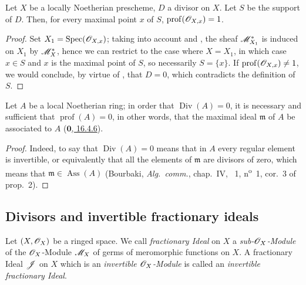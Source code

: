 \begin{corollary}[21.1.9]
\label{IV.21.1.9}
Let $X$ be a locally Noetherian prescheme, $D$ a divisor on $X$.
Let $S$ be the support of $D$.
Then, for every maximal point $x$ of $S$, $\operatorname{prof}(\mathscr{O}_{X,x})=1$.
\end{corollary}

\begin{proof}
Set $X_1=\operatorname{Spec}(\mathscr{O}_{X,x})$;
taking into account  and , the sheaf $\mathscr{M}_{X_1}^*$ is induced on $X_1$ by $\mathscr{M}_X^*$, hence we can restrict to the case where $X=X_1$, in which case $x\in S$ and $x$ is the maximal point of $S$, so necessarily $S=\{x\}$.
If $\operatorname{prof}(\mathscr{O}_{X,x})\neq 1$, we would conclude, by virtue of , that $D=0$, which contradicts the definition of $S$.
\end{proof}

\begin{proposition}[21.1.10]
\label{IV.21.1.10}
Let $A$ be a local Noetherian ring;
in order that $\operatorname{Div}(A)=0$, it is necessary and sufficient that $\operatorname{prof}(A)=0$, in other words, that the maximal ideal $\mathfrak{m}$ of $A$ be associated to $A$
\textup{(\hyperref[0.16.4.6]{$\mathbf{0}$, 16.4.6})}.
\end{proposition}

\begin{proof}
Indeed, to say that $\operatorname{Div}(A)=0$ means that in $A$ every regular element is invertible, or equivalently that all the elements of $\mathfrak{m}$ are divisors of zero, which means that $\mathfrak{m}\in\operatorname{Ass}(A)$ (Bourbaki, \emph{Alg.\ comm.}, chap.~IV, \textsection~1, n\textsuperscript{o}~1, cor.~3 of prop.~2).
\end{proof}

\subsection{Divisors and invertible fractionary ideals}
\label{subsection:IV.21.2}

\begin{env}[21.2.1]
\label{IV.21.2.1}
Let $(X,\mathscr{O}_X)$ be a ringed space.
We call \emph{fractionary Ideal} on $X$ a \emph{sub-$\mathscr{O}_X$-Module} of the $\mathscr{O}_X$-Module $\mathscr{M}_X$ of germs of meromorphic functions on $X$.
A fractionary Ideal $\mathscr{J}$ on $X$ which is an \emph{invertible $\mathscr{O}_X$-Module} is called an \emph{invertible fractionary Ideal}.
\end{env}

